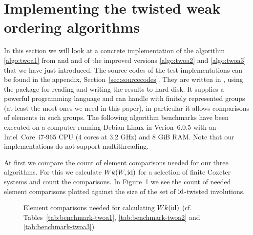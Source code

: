 \section{Implementing the twisted weak ordering algorithms}
\label{sec:implementing-twisted-involutions-algorithms}

In this section we will look at a concrete implementation of the algorithm \ref{algo:twoa1} from \cite{brennemann:twoa} and \cite{haas:twoa} and of the improved versions \ref{algo:twoa2} and \ref{algo:twoa3} that we have just introduced. The source codes of the test implementations can be found in the appendix, Section~\ref{sec:sourcecodes}. They are written in \cite{gap}, using the \cite{gap:io} package for reading and writing the results to hard disk. It supplies a powerful programming language and can handle with finitely represented groups (at least the most ones we need in this paper), in particular it allows comparisons of elements in such groups. The following algorithm benchmarks have been executed on a computer running Debian Linux in Verion~6.0.5 with an Intel\textsuperscript{\textregistered}~Core\textsuperscript{\texttrademark}~i7-965 CPU (4 cores at 3.2 GHz) and 8 GiB RAM. Note that our implementations do not support multithreading.

At first we compare the count of element comparisons needed for our three algorithms. For this we calculate $Wk(W,\operatorname{id})$ for a selection of finite Coxeter systems and count the comparisons. In Figure~\ref{fig:twoa123-element-comparisons} we see the count of needed element comparisons plotted against the size of the set of $\operatorname{id}$-twisted involutions.

\begin{figure}[ht]
	\centering
	\caption{Element comparisons needed for calculating $Wk(\operatorname{id})$ (cf. Tables~\ref{tab:benchmark-twoa1}, \ref{tab:benchmark-twoa2} and \ref{tab:benchmark-twoa3})}
	\label{fig:twoa123-element-comparisons}
\end{figure}

